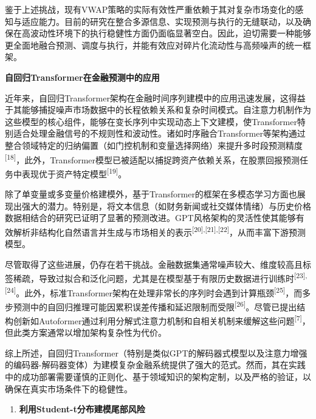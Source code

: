鉴于上述挑战，现有VWAP策略的实际有效性严重依赖于其对复杂市场变化的感知与适应能力。目前的研究在整合多源信息、实现预测与执行的无缝联动，以及确保在高波动性环境下的执行稳健性方面仍面临显著空白。因此，迫切需要一种能够更全面地融合预测、调度与执行，并能有效应对碎片化流动性与高频噪声的统一框架。

  \textbf{自回归Transformer在金融预测中的应用}

近年来，自回归Transformer架构在金融时间序列建模中的应用迅速发展，这得益于其能够捕捉噪声市场数据中的长程依赖关系和复杂时间模式。自注意力机制作为这些模型的核心组件，能够在变长序列中实现动态上下文建模，使Transformer特别适合处理金融信号的不规则性和波动性。诸如时序融合Transformer等架构通过整合领域特定的归纳偏置（如门控机制和变量选择网络）来提升多时段预测精度\textsuperscript{{[}18{]}}，此外，Transformer模型已被适配以捕捉跨资产依赖关系，在股票回报预测任务中表现优于资产特定模型\textsuperscript{{[}19{]}}。

除了单变量或多变量价格建模外，基于Transformer的框架在多模态学习方面也展现出强大的潜力。特别是，将文本信息（如财务新闻或社交媒体情绪）与历史价格数据相结合的研究已证明了显著的预测改进。GPT风格架构的灵活性使其能够有效解析非结构化自然语言并生成与市场相关的表示\textsuperscript{{[}20{]},{[}21{]},{[}22{]}}，从而丰富下游预测模型。

尽管取得了这些进展，仍存在若干挑战。金融数据集通常噪声较大、维度较高且标签稀疏，导致过拟合和泛化问题，尤其是在模型基于有限历史数据进行训练时\textsuperscript{{[}23{]},{[}24{]}}。此外，标准Transformer架构在处理非常长的序列时会遇到计算瓶颈\textsuperscript{{[}25{]}}，而多步预测中的自回归推理可能因累积误差传播和延迟限制而受限\textsuperscript{{[}26{]}}。尽管已提出结构创新如Autoformer通过利用分解式注意力机制和自相关机制来缓解这些问题\textsuperscript{{[}7{]}}，但此类方案通常以增加架构复杂性为代价。

综上所述，自回归Transformer（特别是类似GPT的解码器式模型以及注意力增强的编码器-解码器变体）为建模复杂金融系统提供了强大的范式。然而，其在实践中的成功部署需要谨慎的正则化、基于领域知识的架构定制，以及严格的验证，以确保在真实市场条件下的稳健性。

\begin{enumerate}
\def\labelenumi{\arabic{enumi}.}
\setcounter{enumi}{2}
\item
  \textbf{利用Student-t分布建模尾部风险}
\end{enumerate}

